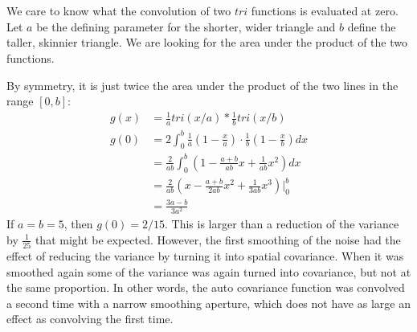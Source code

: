 \documentclass[11pt, oneside]{article}   	%
\begin{document}
\newpage
\section{} %
%
We care to know what the convolution of two $tri$ functions is evaluated at zero.  Let $a$ be the defining parameter for the shorter, wider triangle and $b$ define the taller, skinnier triangle.  We are looking for the area under the product of the two functions. 

\noindent By symmetry, it is just twice the area under the product of the two lines in the range $[0, b]$:
\begin{align*}
g(x) &= \frac{1}{a} tri(x/a) * \frac{1}{b} tri(x/b) \\
g(0) &= 2 \int_{0}^{b} \frac{1}{a} (1-\frac{x}{a}) \cdot \frac{1}{b} (1-\frac{x}{b}) dx \\
&= \frac{2}{ab} \int_{0}^{b} (1-\frac{a+b}{ab} x + \frac{1}{ab} x^2) dx \\
&= \frac{2}{ab} \left(x-\frac{a+b}{2ab} x^2 + \frac{1}{3ab} x^3 \right)\Bigg\rvert_0^b \\
& = \frac{3a-b}{3a^2}
\end{align*}
If $a= b = 5$, then $g(0) = 2/15.$  This is larger than a reduction of the variance by $\frac{1}{25}$ that might be expected.  However, the first smoothing of the noise had the effect of reducing the variance by turning it into spatial covariance.  When it was smoothed again some of the variance was again turned into covariance, but not at the same proportion.  In other words, the auto covariance function was convolved a second time with a narrow smoothing aperture, which does not have as large an effect as convolving the first time.

\newpage
\end{document}
